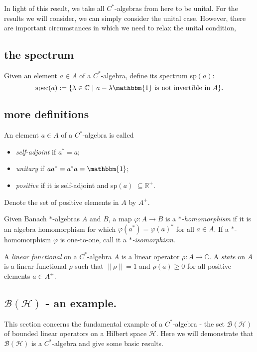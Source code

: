 \documentclass[12pt,a4paper]{amsart}
\theoremstyle{plain}
\theoremstyle{definition}
\renewcommand{\H}{\mathcal{H}}
\newcommand{\B}{\mathcal{B}}
\newcommand{\1}{\mathbbm{1}}
\newcommand{\C}{\mathbb{C}}
\newcommand{\R}{\mathbb{R}}
\renewcommand{\phi}{\varphi}
\begin{document}
In light of this result, we take all $C^\ast$-algebras from here to be unital. 
For the results we will consider, we can simply consider the unital case. 
However, there are important circumstances in which we need to relax the unital condition, 

\subsection{the spectrum}
Given an element $a \in A$ of a $C^\ast$-algebra, define its spectrum sp$(a)$:
\[
	\mbox{spec}(a):=\{\lambda\in \C ~|~ a-\lambda \1 \mbox{ is not invertible in }A\}.
\]


\subsection{more definitions}
An element $a\in A$ of a $C^\ast$-algebra is called 
\begin{itemize}
	\item \emph{self-adjoint} if $a^\ast=a$;
	\item \emph{unitary} if $aa^\ast=a^\ast a = \1$;
	\item \emph{positive} if it is self-adjoint and sp$(a)$ $\subseteq \R^+$.
\end{itemize}
Denote the set of positive elements in $A$ by $A^+$.


	Given Banach $\ast$-algebras $A$ and $B$, a map $\phi:A\to B$ is a \emph{$\ast$-homomorphism} 
	if it is an algebra homomorphism for which $\phi(a^\ast) = \phi(a)^\ast$ for all $a \in A$.
	If a $\ast$-homomorphism $\phi$ is one-to-one, call it a \emph{$\ast$-isomorphism}.




	A \emph{linear functional} on a $C^\ast$-algebra $A$ is a linear operator $\rho:A \to \C$.
	A \emph{state} on $A$ is a linear functional $\rho$ 
	such that \todo{is this right? what of $\rho(\1)=1$?}$\|\rho\|=1$ and $\rho (a) \geq 0$  %
	for all positive elements $a \in A^+$. 




\subsection{$\B(\H)$ - an example.}
This section concerns the fundamental example of a $C^\ast$-algebra - the set $\B(\H)$ of bounded 
linear operators on a Hilbert space $\H$.  
Here we will demonstrate that $\B(\H)$ is a $C^\ast$-algebra and give some basic results.
\end{document}
